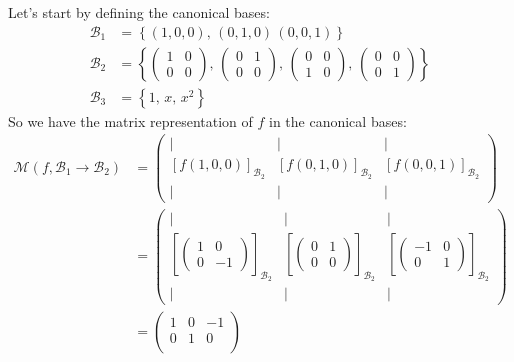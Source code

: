 {\noindent Let's start by defining the canonical bases:
\begin{align*}
\mathcal{B}_1 & = \left\{ (1,0,0), \, (0,1,0) \, (0,0,1) \right\} \\
\mathcal{B}_2 & = \left\{ \begin{pmatrix} 1 & 0 \\ 0 & 0\end{pmatrix}, \, \begin{pmatrix} 0 & 1 \\ 0 & 0\end{pmatrix}, \, \begin{pmatrix} 0 & 0 \\ 1 & 0\end{pmatrix}, \, \begin{pmatrix} 0 & 0 \\ 0 & 1\end{pmatrix} \right\}  \\
\mathcal{B}_3 & = \left\{ 1, \, x, \, x^2 \right\} 
\end{align*}
So we have the matrix representation of $f$ in the canonical bases:
\begin{align*}
\mathcal{M}(f,\mathcal{B}_1 \to \mathcal{B}_2)
&=
\begin{pmatrix}
| & | & | \\
[f(1,0,0)]_{\mathcal{B}_2} & [f(0,1,0)]_{\mathcal{B}_2} & [f(0,0,1)]_{\mathcal{B}_2}\\
| & | & | 
\end{pmatrix} \\
&=
\begin{pmatrix}
| & | & | \\
  \left[\begin{pmatrix}  1 & 0 \\ 0 & -1 \end{pmatrix}\right]_{\mathcal{B}_2} 
& \left[\begin{pmatrix}  0 & 1 \\ 0 &  0 \end{pmatrix}\right]_{\mathcal{B}_2} 
& \left[\begin{pmatrix} -1 & 0 \\ 0 &  1 \end{pmatrix}\right]_{\mathcal{B}_2}\\
| & | & | 
\end{pmatrix}  \\
&=
\begin{pmatrix}
  1 & 0 & -1 \\
  0 & 1 &  0 \\

\end{pmatrix}
\end{align*}}
